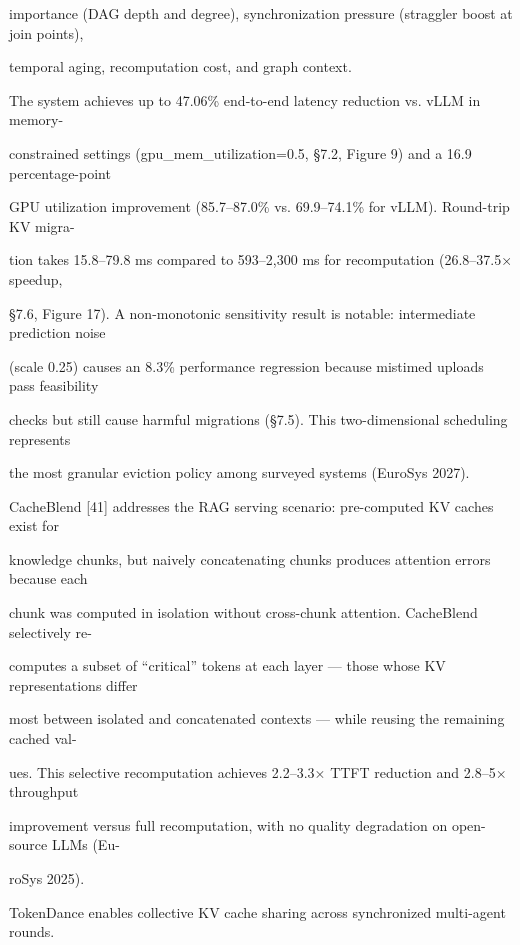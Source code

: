 \begin{flushleft}
\noindent importance (DAG depth and degree), synchronization pressure (straggler boost at join points),\par
\noindent temporal aging, recomputation cost, and graph context.\par
\noindent  The system achieves up to 47.06\% end-to-end latency reduction vs. vLLM in memory-\par
\noindent constrained settings (gpu\_mem\_utilization=0.5, §7.2, Figure 9) and a 16.9 percentage-point\par
\noindent GPU utilization improvement (85.7–87.0\% vs. 69.9–74.1\% for vLLM). Round-trip KV migra-\par
\noindent tion takes 15.8–79.8 ms compared to 593–2,300 ms for recomputation (26.8–37.5× speedup,\par
\noindent §7.6, Figure 17). A non-monotonic sensitivity result is notable: intermediate prediction noise\par
\noindent (scale 0.25) causes an 8.3\% performance regression because mistimed uploads pass feasibility\par
\noindent checks but still cause harmful migrations (§7.5). This two-dimensional scheduling represents\par
\noindent the most granular eviction policy among surveyed systems (EuroSys 2027).\par
\noindent  CacheBlend [41] addresses the RAG serving scenario: pre-computed KV caches exist for\par
\noindent knowledge chunks, but naively concatenating chunks produces attention errors because each\par
\noindent chunk was computed in isolation without cross-chunk attention. CacheBlend selectively re-\par
\noindent computes a subset of “critical” tokens at each layer — those whose KV representations differ\par
\noindent most between isolated and concatenated contexts — while reusing the remaining cached val-\par
\noindent ues. This selective recomputation achieves 2.2–3.3× TTFT reduction and 2.8–5× throughput\par
\noindent improvement versus full recomputation, with no quality degradation on open-source LLMs (Eu-\par
\noindent roSys 2025).\par
\noindent  TokenDance enables collective KV cache sharing across synchronized multi-agent rounds.\par

\end{flushleft}

